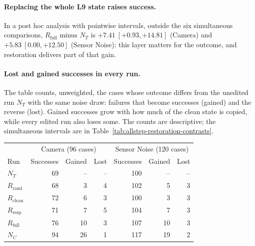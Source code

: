 \paragraph{Replacing the whole L9 state raises success.}
In a post hoc analysis with pointwise intervals, outside the six simultaneous comparisons, $R_{\mathrm{full}}$ minus $N_T$ is $+7.41\ [+0.93,+14.81]$ (Camera) and $+5.83\ [0.00,+12.50]$ (Sensor Noise): this layer matters for the outcome, and restoration delivers part of that gain.

\paragraph{Lost and gained successes in every run.}
The table counts, unweighted, the cases whose outcome differs from the unedited run $N_T$ with the same noise draw: failures that become successes (gained) and the reverse (lost). Gained successes grow with how much of the clean state is copied, while every edited run also loses some. The counts are descriptive; the simultaneous intervals are in Table~\ref{tab:allstep-restoration-contrasts}.

\begin{center}
\small
\setlength{\tabcolsep}{3pt}
\begin{tabular}{@{}lrrrrrr@{}}
\toprule
 & \multicolumn{3}{c}{Camera (96 cases)} & \multicolumn{3}{c}{Sensor Noise (120 cases)}\\
Run & Successes & Gained & Lost & Successes & Gained & Lost\\
\midrule
$N_T$ & 69 & -- & -- & 100 & -- & --\\
$R_{\mathrm{rand}}$ & 68 & 3 & 4 & 102 & 5 & 3\\
$R_{\mathrm{clean}}$ & 72 & 6 & 3 & 100 & 3 & 3\\
$R_{\mathrm{resp}}$ & 71 & 7 & 5 & 104 & 7 & 3\\
$R_{\mathrm{full}}$ & 76 & 10 & 3 & 107 & 10 & 3\\
$N_C$ & 94 & 26 & 1 & 117 & 19 & 2\\
\bottomrule
\end{tabular}
\end{center}
